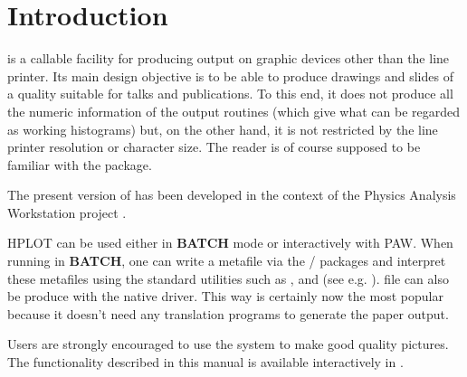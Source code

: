 \chapter{Introduction}

\HPLOT{} is a \FORTRAN{} callable facility for producing \HBOOK\cite{bib-HBOOK}
output on graphic devices other than the line printer. Its main design objective
is to be able to produce drawings and slides of a quality suitable for talks and
publications. To this end, it does not produce all the numeric information of
the \HBOOK{} output routines (which give what can be regarded as working
histograms) but, on the other hand, it is not restricted by the line printer
resolution or character size. The reader is of course supposed to be familiar
with the \HBOOK{} package.

The present version of \HPLOT{} has been developed in the context of the Physics
Analysis Workstation project \PAW\cite{bib-PAW}.

HPLOT can be used either in {\bf BATCH} mode or interactively with PAW. When
running in {\bf BATCH}, one can write a metafile via the \HIGZ{}/\GKS{} packages
and interpret these metafiles using the standard utilities such as
,  and 
(see e.g. \cite{bib-GKS1,bib-GKS2}). \PS{} file can also be produce with the
native \HIGZ{} \PS{} driver. This way is certainly now the most popular because
it doesn't need any translation programs to generate the paper output.

Users are strongly encouraged to use the \PAW{} system to make good quality
pictures. The \HPLOT{} functionality described in this manual is
available interactively in \PAW.



